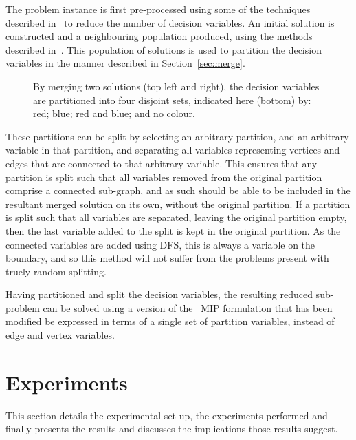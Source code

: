 \documentclass[journal]{IEEEtran}
\begin{document}
The problem instance is first pre-processed using some of the techniques described in~\cite{pp:duin,pp:uchoa,stpg-reduce} to reduce the number of decision variables. An initial solution is constructed and a neighbouring population produced, using the methods described in~\cite{gecco16}. This population of solutions is used to partition the decision variables in the manner described in Section~\ref{sec:merge}.

\begin{figure}[h]
\centering
{}
    \caption[Partitioning variables by merging solutions]{By merging two solutions (top left and right), the decision variables are partitioned into four disjoint sets, indicated here (bottom) by: red; blue; red and blue; and no colour.}\label{fig:stpg-partition} 
\end{figure}

These partitions can be split by selecting an arbitrary partition, and an arbitrary variable in that partition, and separating all variables representing vertices and edges that are connected to that arbitrary variable. This ensures that any partition is split such that all variables removed from the original partition comprise a connected sub-graph, and as such should be able to be included in the resultant merged solution on its own, without the original partition. If a partition is split such that all variables are separated, leaving the original partition empty, then the last variable added to the split is kept in the original partition. As the connected variables are added using DFS, this is always a variable on the boundary, and so this method will not suffer from the problems present with truely random splitting. 

Having partitioned and split the decision variables, the resulting reduced sub-problem can be solved using a version of the~\cite{goemans} MIP formulation that has been modified be expressed in terms of a single set of partition variables, instead of edge and vertex variables.


\section{Experiments}\label{sec:exper}
This section details the experimental set up, the experiments performed and finally presents the results and discusses the implications those results suggest.
\end{document}
